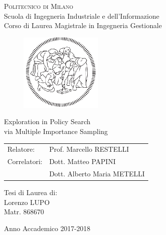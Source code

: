 \begin{titlepage}

	\begin{center}
		\normalsize
			\textsc{Politecnico di Milano}\\
			Scuola di Ingegneria Industriale e dell'Informazione\\
      		Corso di Laurea Magistrale in Ingegneria Gestionale\\
	\end{center}
	\vspace{.6cm}

	\begin{figure}[htpb]
		\centering
		\includegraphics[width=4cm]{Cover/polimi}
	\end{figure}
	\vspace{.6cm}

	\begin{center}
		\LARGE
			Exploration in Policy Search \\
			via Multiple Importance Sampling
	\end{center}
	\vspace{1.6cm}

	\begin{flushleft}
		\large
		\begin{tabular}{ll}
		Relatore:    & Prof. Marcello RESTELLI      \\
		Correlatori: & Dott. Matteo PAPINI \\
					 & Dott. Alberto Maria METELLI
		\end{tabular}
		\vspace{1cm}
	\end{flushleft}

	\begin{flushright}
		\large
		Tesi di Laurea di:\\
		Lorenzo LUPO\\
		Matr. 868670\\
	\end{flushright}

	\vspace*{\fill}
	\begin{center}
		Anno Accademico 2017-2018
	\end{center}

\end{titlepage}
